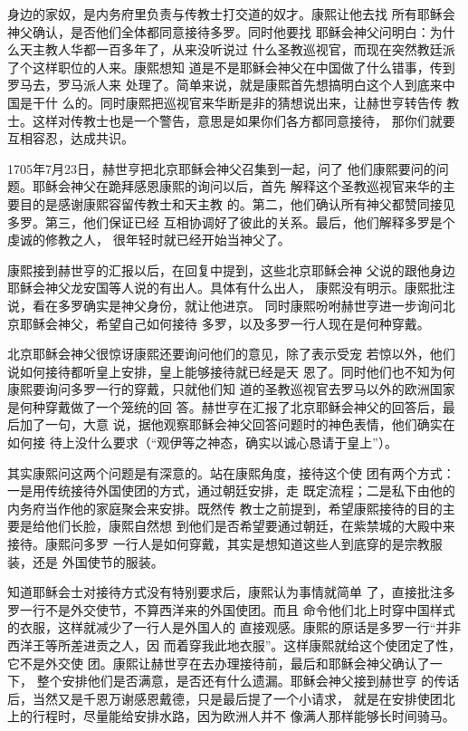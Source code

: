 身边的家奴，是内务府里负责与传教士打交道的奴才。康熙让他去找%
所有耶稣会神父确认，是否他们全体都同意接待多罗。同时他要找%
耶稣会神父问明白：为什么天主教人华都一百多年了，从来没听说过%
什么圣教巡视官，而现在突然教廷派了个这样职位的人来。康熙想知%
道是不是耶稣会神父在中国做了什么错事，传到罗马去，罗马派人来%
处理了。简单来说，就是康熙首先想搞明白这个人到底来中国是干什%
么的。同时康熙把巡视官来华断是非的猜想说出来，让赫世亨转告传%
教士。这样对传教士也是一个警告，意思是如果你们各方都同意接待，%
那你们就要互相容忍，达成共识。%
\par
1705年7月23日，赫世亨把北京耶稣会神父召集到一起，问了%
他们康熙要问的问题。耶稣会神父在跪拜感恩康熙的询问以后，首先%
解释这个圣教巡视官来华的主要目的是感谢康熙容留传教士和天主教%
的。第二，他们确认所有神父都赞同接见多罗。第三，他们保证已经%
互相协调好了彼此的关系。最后，他们解释多罗是个虔诚的修教之人，%
很年轻时就已经开始当神父了。%
\par
康熙接到赫世亨的汇报以后，在回复中提到，这些北京耶稣会神%
父说的跟他身边耶稣会神父龙安国等人说的有出人。具体有什么出人，%
康熙没有明示。康熙批注说，看在多罗确实是神父身份，就让他进京。%
同时康熙吩咐赫世亨进一步询问北京耶稣会神父，希望自己如何接待%
多罗，以及多罗一行人现在是何种穿戴。%
\par
北京耶稣会神父很惊讶康熙还要询问他们的意见，除了表示受宠%
若惊以外，他们说如何接待都听皇上安排，皇上能够接待就已经是天%
恩了。同时他们也不知为何康熙要询问多罗一行的穿戴，只就他们知%
道的圣教巡视官去罗马以外的欧洲国家是何种穿戴做了一个笼统的回%
答。赫世亨在汇报了北京耶稣会神父的回答后，最后加了一句，大意%
说，据他观察耶稣会神父回答问题时的神色表情，他们确实在如何接%
待上没什么要求（“观伊等之神态，确实以诚心恳请于皇上”）。%
\par
其实康熙问这两个问题是有深意的。站在康熙角度，接待这个使%
团有两个方式：一是用传统接待外国使团的方式，通过朝廷安排，走%
既定流程；二是私下由他的内务府当作他的家庭聚会来安排。既然传%
教士之前提到，希望康熙接待的目的主要是给他们长脸，康熙自然想%
到他们是否希望要通过朝廷，在紫禁城的大殿中来接待。康熙问多罗%
一行人是如何穿戴，其实是想知道这些人到底穿的是宗教服装，还是%
外国使节的服装。%
\par
知道耶稣会士对接待方式没有特别要求后，康熙认为事情就简单%
了，直接批注多罗一行不是外交使节，不算西洋来的外国使团。而且%
命令他们北上时穿中国样式的衣服，这样就减少了一行人是外国人的%
直接观感。康熙的原话是多罗一行“并非西洋王等所差进贡之人，因%
而着穿我此地衣服”。这样康熙就给这个使团定了性，它不是外交使%
团。康熙让赫世亨在去办理接待前，最后和耶稣会神父确认了一下，%
整个安排他们是否满意，是否还有什么遗漏。耶稣会神父接到赫世亨%
的传话后，当然又是千恩万谢感恩戴德，只是最后提了一个小请求，%
就是在安排使团北上的行程时，尽量能给安排水路，因为欧洲人并不%
像满人那样能够长时间骑马。%
